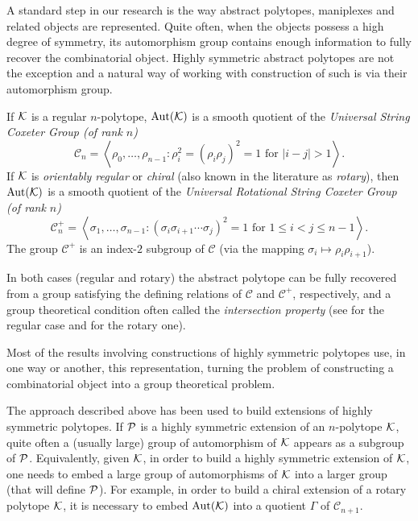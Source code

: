 \documentclass[a4paper,12pt,english]{article}
\begin{document}
A standard step in our research is the way abstract polytopes, maniplexes and related objects are represented.
Quite often, when the objects possess a high degree of symmetry, its automorphism group contains enough information to fully recover the combinatorial object.
Highly symmetric abstract polytopes are not the exception and a natural way of working with construction of such is via their automorphism group.

If $\mathcal{K}$ is a regular $n$-polytope, $\operatorname{Aut}(\mathcal{K})$ is a smooth quotient of the \emph{Universal String Coxeter Group (of rank $n$)} 
\[\mathcal{C}_{n} = \left\langle \rho_{0}, \dots, \rho_{n-1} : \rho^{2}_{i} = (\rho_{i} \rho_{j})^{2} = 1 \text{ for } |i-j| > 1\right\rangle. \]
% 
If $\mathcal{K}$ is \emph{orientably regular} or \emph{chiral} (also known in the literature as \emph{rotary}), then $\operatorname{Aut}(\mathcal{K})$ is a smooth quotient of the \emph{Universal Rotational String Coxeter Group (of rank $n$)} 
\[ \mathcal{C}_{n}^{+} = \left\langle \sigma_{1}, \dots, \sigma_{n-1} : (\sigma_{i} \sigma_{i+1} \cdots \sigma_{j})^{2} = 1 \text{ for } 1 \leq i < j \leq n-1 \right\rangle.  \] 
The group $\mathcal{C}^{+}$ is an index-$2$ subgroup of $\mathcal{C}$ (via the mapping $\sigma_{i} \mapsto \rho_{i}\rho_{i+1}$). 

In both cases (regular and rotary) the abstract polytope can be fully recovered from a group satisfying the defining relations of $\mathcal{C}$ and $\mathcal{C}^{+}$, respectively, and a group theoretical condition often called the \emph{intersection property} (see \cite[Theorem]{McMulSchul2002_AbstractRegularPolytopes} for the regular case and \cite[Theorem]{SchulWeiss1991_ChiralPolytopes} for the rotary one).


Most of the results involving constructions of highly symmetric polytopes use, in one way or another, this representation, turning the problem of constructing a combinatorial object into a group theoretical problem. 

The approach described above has been used to build extensions of highly symmetric polytopes. 
If $\mathcal{P}$ is a highly symmetric extension of an $n$-polytope $\mathcal{K}$, quite often a (usually large) group of automorphism of $\mathcal{K}$ appears as a subgroup of $\mathcal{P}$. 
Equivalently, given $\mathcal{K}$, in order to build a highly symmetric extension of $\mathcal{K}$, one needs to embed a large group of automorphisms of $\mathcal{K}$ into a larger group (that will define $\mathcal{P}$). 
For example, in order to build a chiral extension of a rotary polytope $\mathcal{K}$, it is necessary to embed $\operatorname{Aut}(\mathcal{K})$ into a quotient $\Gamma$ of $\mathcal{C}_{n+1}$. 
\end{document}
